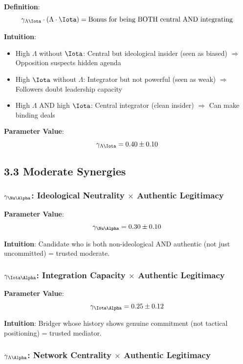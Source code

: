 \textbf{Definition}:
$$\gamma_{\Lambda\Iota} \cdot (\Lambda \cdot \Iota) = \text{Bonus for being BOTH central AND integrating}$$

\textbf{Intuition}:

\begin{itemize}
\item High $\Lambda$ without $\Iota$: Central but ideological insider (seen as biased) $\Rightarrow$ Opposition suspects hidden agenda
\item High $\Iota$ without $\Lambda$: Integrator but not powerful (seen as weak) $\Rightarrow$ Followers doubt leadership capacity
\item High $\Lambda$ AND high $\Iota$: Central integrator (clean insider) $\Rightarrow$ Can make binding deals
\end{itemize}

\textbf{Parameter Value}:
$$\gamma_{\Lambda\Iota} = 0.40 \pm 0.10$$

\subsection{3.3 Moderate Synergies}

\subsubsection{$\gamma_{\Nu\Alpha}$: Ideological Neutrality $\times$ Authentic Legitimacy}

\textbf{Parameter Value}:
$$\gamma_{\Nu\Alpha} = 0.30 \pm 0.10$$

\textbf{Intuition}: Candidate who is both non-ideological AND authentic (not just uncommitted) = trusted moderate.

\subsubsection{$\gamma_{\Iota\Alpha}$: Integration Capacity $\times$ Authentic Legitimacy}

\textbf{Parameter Value}:
$$\gamma_{\Iota\Alpha} = 0.25 \pm 0.12$$

\textbf{Intuition}: Bridger whose history shows genuine commitment (not tactical positioning) = trusted mediator.

\subsubsection{$\gamma_{\Lambda\Alpha}$: Network Centrality $\times$ Authentic Legitimacy}

